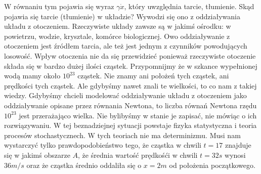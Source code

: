 \documentclass[a4paper,12pt,polish]{sphinxmanual}
\begin{document}
W równaniu tym pojawia się wyraz $\gamma \dot x$, który uwzględnia tarcie, tłumienie. Skąd pojawia się tarcie (tłumienie) w układzie? Wywodzi się ono z oddziaływania układu z otoczeniem. Rzeczywiste układy zawsze są w jakimś ośrodku: w powietrzu, wodzie, krysztale, komórce biologicznej. Owo oddziaływanie z otoczeniem jest źródłem tarcia, ale też jest jednym z czynników powodujących losowość. Wpływ otoczenia nie da się przewidzieć ponieważ rzeczywiste otoczenie składa się w bardzo dużej ilości cząstek. Przypomnijmy że w szkance wypełnionej wodą mamy około $10^{23}$ cząstek. Nie znamy ani położeń tych cząstek, ani prędkości tych cząstek. Ale gdybyśmy nawet znali te wielkości, to co nam z takiej wiedzy. Gdybyśmy chcieli modelować oddziaływanie układu z otoczeniem jako oddziaływanie opisane przez równania Newtona, to liczba równań Newtona rzędu $10^{23}$ jest przerażająco wielka. Nie bylibyśmy w stanie je zapisać, nie mówiąc o ich rozwiązywaniu. W tej beznadziejnej sytuacji powstaje fizyka statystyczna i teoria procesów stochastycznech. W tych teoriach nie ma determinizmu. Musi nam wystarczyć tylko prawdopodobieństwo tego, że cząstka w chwili $t=17$ znajduje się w jakimś obszarze $A$, że średnia wartość prędkośći w chwili $t=32 s$ wynosi $36 m/s$ oraz że cząstka średnio oddaliła się o $x=2 m$ od położenia początkowego.
\end{document}
